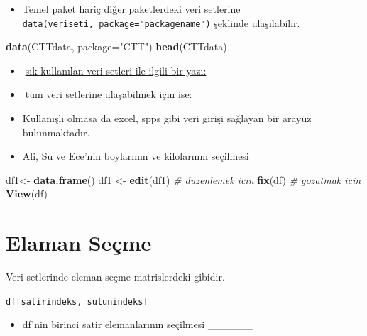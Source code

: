 \documentclass[
  oneside]{book}
\newenvironment{Shaded}{\begin{snugshade}}{\end{snugshade}}
\newcommand{\AttributeTok}[1]{\textcolor[rgb]{0.13,0.29,0.53}{#1}}
\newcommand{\CommentTok}[1]{\textcolor[rgb]{0.56,0.35,0.01}{\textit{#1}}}
\newcommand{\FunctionTok}[1]{\textcolor[rgb]{0.13,0.29,0.53}{\textbf{#1}}}
\newcommand{\NormalTok}[1]{#1}
\newcommand{\OtherTok}[1]{\textcolor[rgb]{0.56,0.35,0.01}{#1}}
\newcommand{\StringTok}[1]{\textcolor[rgb]{0.31,0.60,0.02}{#1}}
\providecommand{\tightlist}{%
  \setlength{\itemsep}{0pt}\setlength{\parskip}{0pt}}
\begin{document}
\begin{itemize}
\tightlist
\item
  Temel paket hariç diğer paketlerdeki veri setlerine \texttt{data(veriseti,\ package="packagename")} şeklinde ulaşılabilir.
\end{itemize}

\begin{Shaded}
\begin{Highlighting}[]
\FunctionTok{data}\NormalTok{(CTTdata, }\AttributeTok{package=}\StringTok{"CTT"}\NormalTok{) }
\FunctionTok{head}\NormalTok{(CTTdata)}
\end{Highlighting}
\end{Shaded}

\begin{itemize}
\item
  🔗\href{http://r-tutorials.com/famous-useful-pre-installed-exercise-datasets-r/}{sık kullanılan veri setleri ile ilgili bir yazı:}
\item
  🔗\href{https://vincentarelbundock.github.io/Rdatasets/datasets.html}{tüm veri setlerine ulaşabilmek için ise:}
\item
  Kullanışlı olmasa da excel, spps gibi veri girişi sağlayan bir arayüz bulunmaktadır.
\item
  Ali, Su ve Ece'nin boylarının ve kilolarının seçilmesi
\end{itemize}

\begin{Shaded}
\begin{Highlighting}[]
\NormalTok{df1}\OtherTok{\textless{}{-}} \FunctionTok{data.frame}\NormalTok{() }
\NormalTok{df1 }\OtherTok{\textless{}{-}} \FunctionTok{edit}\NormalTok{(df1)}
\CommentTok{\# duzenlemek icin}
\FunctionTok{fix}\NormalTok{(df)}
\CommentTok{\# gozatmak icin }
\FunctionTok{View}\NormalTok{(df)}
\end{Highlighting}
\end{Shaded}

\hypertarget{elaman-seuxe7me}{%
\section{Elaman Seçme}\label{elaman-seuxe7me}}

Veri setlerinde eleman seçme matrislerdeki gibidir.

\texttt{df{[}satirindeks,\ sutunindeks{]}}

\begin{itemize}
\tightlist
\item
  df'nin birinci satir elemanlarının seçilmesi \_\_\_\_\_\_
\end{itemize}
\end{document}

